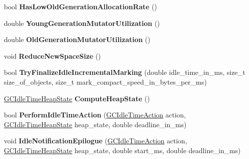 \begin{DoxyCompactItemize}
\item 
bool {\bfseries Has\+Low\+Old\+Generation\+Allocation\+Rate} ()\hypertarget{classv8_1_1internal_1_1_heap_ad43fc20877f7b2b1a7362b91a821a8ff}{}\label{classv8_1_1internal_1_1_heap_ad43fc20877f7b2b1a7362b91a821a8ff}

\item 
double {\bfseries Young\+Generation\+Mutator\+Utilization} ()\hypertarget{classv8_1_1internal_1_1_heap_a2e7f2809a106e5af75fa62b574577238}{}\label{classv8_1_1internal_1_1_heap_a2e7f2809a106e5af75fa62b574577238}

\item 
double {\bfseries Old\+Generation\+Mutator\+Utilization} ()\hypertarget{classv8_1_1internal_1_1_heap_a80fb412c270aadbd53f26eaccb3216bf}{}\label{classv8_1_1internal_1_1_heap_a80fb412c270aadbd53f26eaccb3216bf}

\item 
void {\bfseries Reduce\+New\+Space\+Size} ()\hypertarget{classv8_1_1internal_1_1_heap_a6172de8c81e44087053bc42a0b5f5f5c}{}\label{classv8_1_1internal_1_1_heap_a6172de8c81e44087053bc42a0b5f5f5c}

\item 
bool {\bfseries Try\+Finalize\+Idle\+Incremental\+Marking} (double idle\+\_\+time\+\_\+in\+\_\+ms, size\+\_\+t size\+\_\+of\+\_\+objects, size\+\_\+t mark\+\_\+compact\+\_\+speed\+\_\+in\+\_\+bytes\+\_\+per\+\_\+ms)\hypertarget{classv8_1_1internal_1_1_heap_a3ea12cc24e97700b3b2ffd580f454ce3}{}\label{classv8_1_1internal_1_1_heap_a3ea12cc24e97700b3b2ffd580f454ce3}

\item 
\hyperlink{classv8_1_1internal_1_1_g_c_idle_time_heap_state}{G\+C\+Idle\+Time\+Heap\+State} {\bfseries Compute\+Heap\+State} ()\hypertarget{classv8_1_1internal_1_1_heap_ab5eb0ae27ffbc481dcfa7f61dafeb342}{}\label{classv8_1_1internal_1_1_heap_ab5eb0ae27ffbc481dcfa7f61dafeb342}

\item 
bool {\bfseries Perform\+Idle\+Time\+Action} (\hyperlink{classv8_1_1internal_1_1_g_c_idle_time_action}{G\+C\+Idle\+Time\+Action} action, \hyperlink{classv8_1_1internal_1_1_g_c_idle_time_heap_state}{G\+C\+Idle\+Time\+Heap\+State} heap\+\_\+state, double deadline\+\_\+in\+\_\+ms)\hypertarget{classv8_1_1internal_1_1_heap_ad32d29a7f0733ce4f9fb9fbe2244f5b7}{}\label{classv8_1_1internal_1_1_heap_ad32d29a7f0733ce4f9fb9fbe2244f5b7}

\item 
void {\bfseries Idle\+Notification\+Epilogue} (\hyperlink{classv8_1_1internal_1_1_g_c_idle_time_action}{G\+C\+Idle\+Time\+Action} action, \hyperlink{classv8_1_1internal_1_1_g_c_idle_time_heap_state}{G\+C\+Idle\+Time\+Heap\+State} heap\+\_\+state, double start\+\_\+ms, double deadline\+\_\+in\+\_\+ms)\hypertarget{classv8_1_1internal_1_1_heap_a3d6b9728e1f0c89c55ed15bb49869d99}{}\label{classv8_1_1internal_1_1_heap_a3d6b9728e1f0c89c55ed15bb49869d99}


\end{DoxyCompactItemize}
